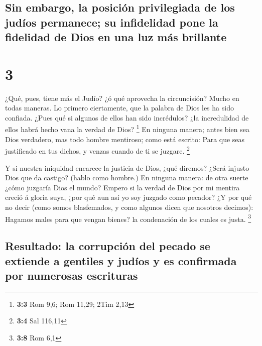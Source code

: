 \hypertarget{sin-embargo-la-posiciuxf3n-privilegiada-de-los-juduxedos-permanece-su-infidelidad-pone-la-fidelidad-de-dios-en-una-luz-muxe1s-brillante}{%
\subsection{Sin embargo, la posición privilegiada de los judíos
permanece; su infidelidad pone la fidelidad de Dios en una luz más
brillante}\label{sin-embargo-la-posiciuxf3n-privilegiada-de-los-juduxedos-permanece-su-infidelidad-pone-la-fidelidad-de-dios-en-una-luz-muxe1s-brillante}}

\hypertarget{section-2}{%
\section{3}\label{section-2}}

 ¿Qué, pues, tiene más el Judío? ¿ó qué aprovecha la
circuncisión?  Mucho en todas maneras. Lo primero
ciertamente, que la palabra de Dios les ha sido confiada. 
¿Pues qué si algunos de ellos han sido incrédulos? ¿la incredulidad de
ellos habrá hecho vana la verdad de Dios? \footnote{\textbf{3:3} Rom
  9,6; Rom 11,29; 2Tim 2,13}  En ninguna manera; antes
bien sea Dios verdadero, mas todo hombre mentiroso; como está escrito:
Para que seas justificado en tus dichos, y venzas cuando de ti se
juzgare. \footnote{\textbf{3:4} Sal 116,11}

 Y si nuestra iniquidad encarece la justicia de Dios, ¿qué
diremos? ¿Será injusto Dios que da castigo? (hablo como hombre.)
 En ninguna manera: de otra suerte ¿cómo juzgaría Dios el
mundo?  Empero si la verdad de Dios por mi mentira creció
á gloria suya, ¿por qué aun así yo soy juzgado como pecador?
 ¿Y por qué no decir (como somos blasfemados, y como
algunos dicen que nosotros decimos): Hagamos males para que vengan
bienes? la condenación de los cuales es justa. \footnote{\textbf{3:8}
  Rom 6,1}

\hypertarget{resultado-la-corrupciuxf3n-del-pecado-se-extiende-a-gentiles-y-juduxedos-y-es-confirmada-por-numerosas-escrituras}{%
\subsection{Resultado: la corrupción del pecado se extiende a gentiles y
judíos y es confirmada por numerosas
escrituras}\label{resultado-la-corrupciuxf3n-del-pecado-se-extiende-a-gentiles-y-juduxedos-y-es-confirmada-por-numerosas-escrituras}}

